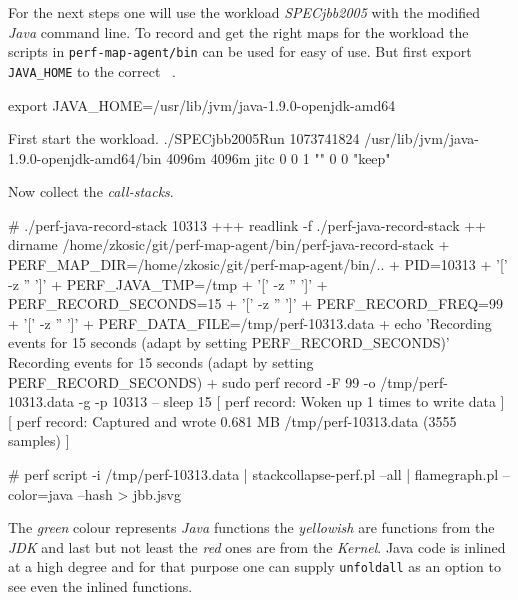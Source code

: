 {{For the next steps one will use the workload {\em SPECjbb2005} with the modified
{\em Java} command line. To record and get the right maps for the workload
the scripts in {\tt perf-map-agent/bin} can be used for easy of use. But first
export  {\tt JAVA_HOME} to the correct \JDK\ .

\starttyping
export JAVA_HOME=/usr/lib/jvm/java-1.9.0-openjdk-amd64
\stoptyping

First start the workload.
\starttyping
./SPECjbb2005Run 1073741824  /usr/lib/jvm/java-1.9.0-openjdk-amd64/bin  4096m   4096m   jitc  0   0 1  ""   0  0 "keep"
\stoptyping


Now collect the {\em call-stacks}.

\starttyping
# ./perf-java-record-stack 10313
+++ readlink -f ./perf-java-record-stack
++ dirname /home/zkosic/git/perf-map-agent/bin/perf-java-record-stack
+ PERF_MAP_DIR=/home/zkosic/git/perf-map-agent/bin/..
+ PID=10313
+ '[' -z '' ']'
+ PERF_JAVA_TMP=/tmp
+ '[' -z '' ']'
+ PERF_RECORD_SECONDS=15
+ '[' -z '' ']'
+ PERF_RECORD_FREQ=99
+ '[' -z '' ']'
+ PERF_DATA_FILE=/tmp/perf-10313.data
+ echo 'Recording events for 15 seconds (adapt by setting PERF_RECORD_SECONDS)'
Recording events for 15 seconds (adapt by setting PERF_RECORD_SECONDS)
+ sudo perf record -F 99 -o /tmp/perf-10313.data -g -p 10313 -- sleep 15
[ perf record: Woken up 1 times to write data ]
[ perf record: Captured and wrote 0.681 MB /tmp/perf-10313.data (3555 samples) ]
\stoptyping


\starttyping
# perf script -i /tmp/perf-10313.data | stackcollapse-perf.pl --all | flamegraph.pl --color=java --hash > jbb.jsvg
\stoptyping



\setupfloat
[bleedfigure]
[
  leftmargindistance=0mm,
  rightmargindistance=0mm,
default={backspace}]




\setupcaption [figure][location={bottom}]
\startplacefigure[title={Flamegraph of {\em Java}, {\em JDK} and Kernel}]
\stopplacefigure


The {\em green} colour represents {\em Java} functions the {\em yellowish} are functions
from the {\em JDK} and last but not least the {\em red} ones are from the {\em Kernel}. {\em}
Java code is inlined at a high degree and for that purpose one can supply {\tt unfoldall} as an
option to see even the inlined functions.

}}
